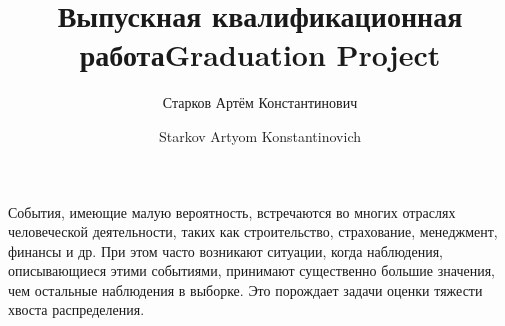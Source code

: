\documentclass[12pt, specialist, subf, substylefile = spbu.rtx]{disser}
\begin{document}



\title{Выпускная квалификационная работа}
\author{Старков Артём Константинович}




\date{\number\year}

\maketitle


%
\title{Graduation Project}


\author{Starkov Artyom Konstantinovich}



\date{\number\year}

\maketitle[en]



\tableofcontents


\intro

События, имеющие малую вероятность, встречаются во многих отраслях человеческой деятельности, таких как строительство, страхование, менеджмент, финансы и др. При этом часто возникают ситуации, когда наблюдения, описывающиеся этими событиями, принимают существенно большие значения, чем остальные наблюдения в выборке. Это порождает задачи оценки тяжести хвоста распределения.
\end{document}
